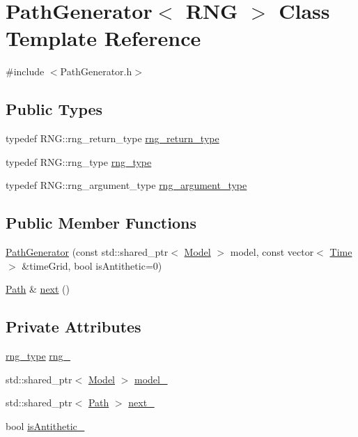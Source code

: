 \hypertarget{class_path_generator}{}\section{Path\+Generator$<$ R\+NG $>$ Class Template Reference}
\label{class_path_generator}


{\ttfamily \#include $<$Path\+Generator.\+h$>$}

\subsection*{Public Types}
\begin{DoxyCompactItemize}
\item 
typedef R\+N\+G\+::rng\+\_\+return\+\_\+type \hyperlink{class_path_generator_a7e88a4843d6bb3488b62b1516760a031}{rng\+\_\+return\+\_\+type}
\item 
typedef R\+N\+G\+::rng\+\_\+type \hyperlink{class_path_generator_a519a5baf42ff4c7c1addc9a4f2826b12}{rng\+\_\+type}
\item 
typedef R\+N\+G\+::rng\+\_\+argument\+\_\+type \hyperlink{class_path_generator_ae1055b21996819be953fb102e5980c18}{rng\+\_\+argument\+\_\+type}
\end{DoxyCompactItemize}
\subsection*{Public Member Functions}
\begin{DoxyCompactItemize}
\item 
\hyperlink{class_path_generator_aca7349e0f3e916f634b1a162756b5e1a}{Path\+Generator} (const std\+::shared\+\_\+ptr$<$ \hyperlink{class_model}{Model} $>$ model, const vector$<$ \hyperlink{_name_def_8h_ac2d3e0ba793497bcca555c7c2cf64ff3}{Time} $>$ \&time\+Grid, bool is\+Antithetic=0)
\item 
\hyperlink{class_path}{Path} \& \hyperlink{class_path_generator_a848a4f432d86df5b03d835d99472ab37}{next} ()
\end{DoxyCompactItemize}
\subsection*{Private Attributes}
\begin{DoxyCompactItemize}
\item 
\hyperlink{class_path_generator_a519a5baf42ff4c7c1addc9a4f2826b12}{rng\+\_\+type} \hyperlink{class_path_generator_a4fad0001eee9b8185049f3c860f53b1f}{rng\+\_\+}
\item 
std\+::shared\+\_\+ptr$<$ \hyperlink{class_model}{Model} $>$ \hyperlink{class_path_generator_a80dcaacd0b79c84c4bf83e980f5ed7ff}{model\+\_\+}
\item 
std\+::shared\+\_\+ptr$<$ \hyperlink{class_path}{Path} $>$ \hyperlink{class_path_generator_a2af5b3cab0498565a56b20e97a3d6f35}{next\+\_\+}
\item 
bool \hyperlink{class_path_generator_aa45100f04c27cd0f25c059c410316346}{is\+Antithetic\+\_\+}
\end{DoxyCompactItemize}


